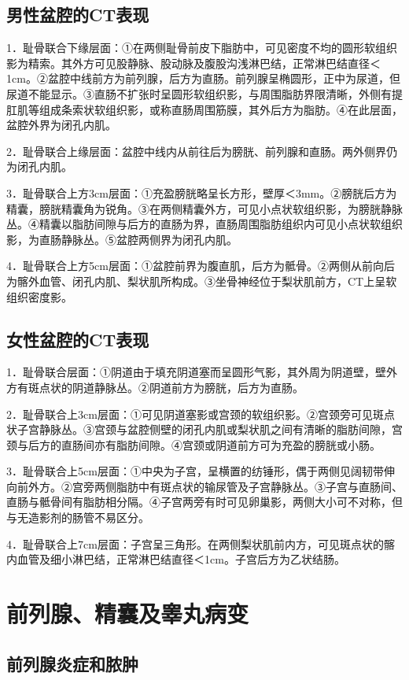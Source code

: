 \subsection{男性盆腔的CT表现}

1．耻骨联合下缘层面：①在两侧耻骨前皮下脂肪中，可见密度不均的圆形软组织影为精索。其外方可见股静脉、股动脉及腹股沟浅淋巴结，正常淋巴结直径＜1cm。②盆腔中线前方为前列腺，后方为直肠。前列腺呈椭圆形，正中为尿道，但尿道不能显示。③直肠不扩张时呈圆形软组织影，与周围脂肪界限清晰，外侧有提肛肌等组成条索状软组织影，或称直肠周围筋膜，其外后方为脂肪。④在此层面，盆腔外界为闭孔内肌。

2．耻骨联合上缘层面：盆腔中线内从前往后为膀胱、前列腺和直肠。两外侧界仍为闭孔内肌。

3．耻骨联合上方3cm层面：①充盈膀胱略呈长方形，壁厚＜3mm。②膀胱后方为精囊，膀胱精囊角为锐角。③在两侧精囊外方，可见小点状软组织影，为膀胱静脉丛。④精囊以脂肪间隙与后方的直肠为界，直肠周围脂肪组织内可见小点状软组织影，为直肠静脉丛。⑤盆腔两侧界为闭孔内肌。

4．耻骨联合上方5cm层面：①盆腔前界为腹直肌，后方为骶骨。②两侧从前向后为髂外血管、闭孔内肌、梨状肌所构成。③坐骨神经位于梨状肌前方，CT上呈软组织密度影。

\subsection{女性盆腔的CT表现}

1．耻骨联合层面：①阴道由于填充阴道塞而呈圆形气影，其外周为阴道壁，壁外方有斑点状的阴道静脉丛。②阴道前方为膀胱，后方为直肠。

2．耻骨联合上3cm层面：①可见阴道塞影或宫颈的软组织影。②宫颈旁可见斑点状子宫静脉丛。③宫颈与盆腔侧壁的闭孔内肌或梨状肌之间有清晰的脂肪间隙，宫颈与后方的直肠间亦有脂肪间隙。④宫颈或阴道前方可为充盈的膀胱或小肠。

3．耻骨联合上5cm层面：①中央为子宫，呈横置的纺锤形，偶于两侧见阔韧带伸向前外方。②宫旁两侧脂肪中有斑点状的输尿管及子宫静脉丛。③子宫与直肠间、直肠与骶骨间有脂肪相分隔。④子宫两旁有时可见卵巢影，两侧大小可不对称，但与无造影剂的肠管不易区分。

4．耻骨联合上7cm层面：子宫呈三角形。在两侧梨状肌前内方，可见斑点状的髂内血管及细小淋巴结，正常淋巴结直径＜1cm。子宫后方为乙状结肠。

\section{前列腺、精囊及睾丸病变}

\subsection{前列腺炎症和脓肿}

